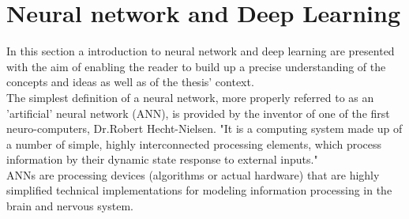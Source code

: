 \section{Neural network and Deep Learning}
In this section a introduction to neural network and deep learning are presented with the aim of enabling the reader to build up a precise understanding of the concepts and ideas as well as of the thesis' context.\\
The simplest definition of a neural network, more properly referred to as an 'artificial' neural network (ANN), is provided by the inventor of one of the first neuro-computers, Dr.Robert Hecht-Nielsen. "It is a computing system made up of a number of simple, highly interconnected processing elements, which process information by their dynamic state response to external inputs."\\
ANNs are processing devices (algorithms or actual hardware) that are highly simplified technical implementations for modeling information processing in the brain and nervous system.
